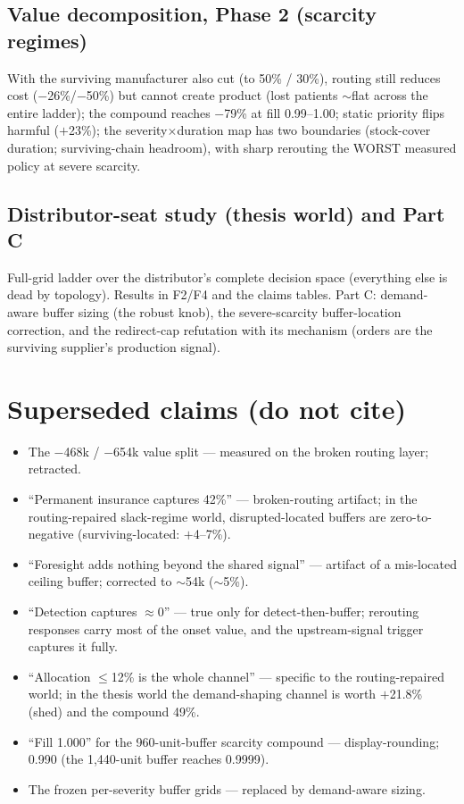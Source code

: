 \documentclass[11pt]{article}
\begin{document}
\subsection{Value decomposition, Phase 2 (scarcity regimes)}
With the surviving manufacturer also cut (to 50\% / 30\%), routing still reduces cost
($-$26\%/$-$50\%) but cannot create product (lost patients $\sim$flat across the entire
ladder); the compound reaches $-$79\% at fill 0.99--1.00; static priority flips harmful
($+$23\%); the severity$\times$duration map has two boundaries (stock-cover duration;
surviving-chain headroom), with sharp rerouting the WORST measured policy at severe
scarcity.

\subsection{Distributor-seat study (thesis world) and Part C}
Full-grid ladder over the distributor's complete decision space (everything else is dead by
topology). Results in F2/F4 and the claims tables. Part C: demand-aware buffer sizing (the
robust knob), the severe-scarcity buffer-location correction, and the redirect-cap
refutation with its mechanism (orders are the surviving supplier's production signal).

\section{Superseded claims (do not cite)}\label{sec:superseded}
\begin{itemize}
\item The $-$468k / $-$654k value split --- measured on the broken routing layer; retracted.
\item ``Permanent insurance captures 42\%'' --- broken-routing artifact; in the
routing-repaired slack-regime world, disrupted-located buffers are zero-to-negative
(surviving-located: $+$4--7\%).
\item ``Foresight adds nothing beyond the shared signal'' --- artifact of a mis-located
ceiling buffer; corrected to $\sim$54k ($\sim$5\%).
\item ``Detection captures $\approx$0'' --- true only for detect-then-buffer; rerouting
responses carry most of the onset value, and the upstream-signal trigger captures it fully.
\item ``Allocation $\le$12\% is the whole channel'' --- specific to the routing-repaired
world; in the thesis world the demand-shaping channel is worth $+$21.8\% (shed) and the
compound 49\%.
\item ``Fill 1.000'' for the 960-unit-buffer scarcity compound --- display-rounding;
0.990 (the 1,440-unit buffer reaches 0.9999).
\item The frozen per-severity buffer grids --- replaced by demand-aware sizing.
\end{itemize}
\end{document}
